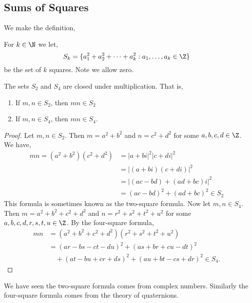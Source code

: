 \subsection{Sums of Squares}
We make the definition,
\begin{ndefi}[$S_k$]
  For $k \in \N$ we let,
  $$ S_k = \{a_1^2 + a_2^2 + \dots + a_k^2 : a_1, \dots, a_k \in \Z\} $$
  be the set of $k$ squares. Note we allow zero.
\end{ndefi}

\begin{nthm}[]
  The sets $S_2$ and $S_4$ are closed under multiplication. That is,
  \begin{enumerate}
    \item If $m, n \in S_2$, then $mn \in S_2$
    \item If $m,n \in S_4$, then $mn \in S_4$.
  \end{enumerate}
\end{nthm}
\begin{proof}
  Let $m,n \in S_2$. Then $m = a^2 + b^2$ and $n = c^2 + d^2$ for some $a, b, c, d \in \Z$. We have,
  \begin{align*}
    mn = (a^2 + b^2)(c^2 + d^2) &= |a + bi|^2 |c + di|^2 \\
    &= |(a + bi)(c + di)|^2 \\
    &= |(ac - bd) + (ad + bc)i| ^2 \\
    &= (ac - bd)^2 + (ad + bc)^2 \in S_2
  \end{align*}
  This formula is sometimes known as the two-square formula. Now let $m,n \in S_4$. Then $m = a^2 + b^2 + c^2 + d^2$ and $n = r^2 + s^2 + t^2 + u^2$ for some $a, b, c, d, r, s, t, u \in \Z$. By the four-square formula,
  \begin{align*}
    mn &= (a^2 + b^2 + c^2 + d^2)(r^2 + s^2 + t^2 + u^2) \\
    &= (ar - bs - ct - du)^2 + (as + br + cu - dt)^2 \\
    &\quad + (at - bu + cr + ds)^2 + (au + bt - cs + dr)^2 \in S_4.
  \end{align*}
\end{proof}

\begin{remark}
   We have seen the two-square formula comes from complex numbers. Similarly the four-square formula comes from the theory of quaternions.
\end{remark}

